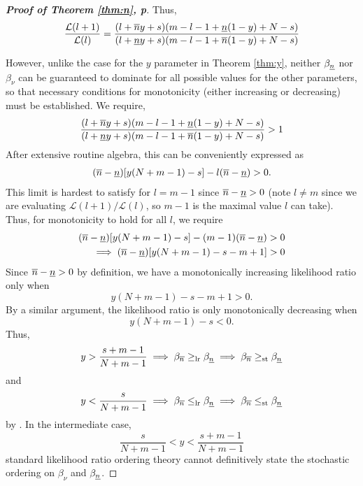 \documentclass[12pt, a4paper]{elsarticle}
\begin{document}
\begin{proof}[\textbf{Proof of Theorem \ref{thm:n}, p\pageref{thm:n}}]
  Thus,
  \[ \frac{\mathcal{L}(l+1)}{\mathcal{L}(l)} =
      \frac{(l + \overline{n} y + s) (m - l - 1 + \underline{n} (1 - y) + N - s)}
           {(l + \underline{n} y + s) (m - l - 1 + \overline{n} (1 - y) + N - s)}
  \]
  
  However, unlike the case for the $y$ parameter in Theorem \ref{thm:y}, neither $\beta_{\underline{n}}$ 
  nor $\beta_{\nu}$ can be guaranteed to dominate for all possible values 
  for the other parameters, so that necessary conditions for
  monotonicity (either increasing or decreasing) must be established.
  We require,
  \[ \frac{(l + \overline{n} y + s) (m - l - 1 + \underline{n} (1 - y) + N - s)}
          {(l + \underline{n} y + s) (m - l - 1 + \overline{n} (1 - y) + N - s)}
     >1
  \]
  After extensive routine algebra, this can be conveniently expressed as
  \begin{align*}
    (\overline{n} - \underline{n})[y (N + m - 1) - s] - l (\overline{n} - \underline{n})>0.
  \end{align*}
  This limit is hardest to satisfy for $l=m-1$ since $\overline{n}-\underline{n}>0$ (note $l\ne m$ since we are evaluating $\mathcal{L}(l+1)/\mathcal{L}(l)$, so $m-1$ is the maximal value $l$ can take).
  Thus, for monotonicity to hold for all $l$, we require
  \begin{align*}
    (\overline{n} - \underline{n})[y (N + m - 1) - s] - (m - 1) (\overline{n} - \underline{n}) &>0 \\
    \implies (\overline{n} - \underline{n})[y (N + m - 1) - s - m + 1] &>0
  \end{align*}
  Since $\overline{n}-\underline{n}>0$ by definition, we have a monotonically increasing 
  likelihood ratio only when \[ y (N + m - 1) - s - m + 1 > 0. \]
  By a similar argument, the likelihood ratio is only monotonically decreasing when
  \[ y (N + m - 1) - s < 0. \]
  Thus,
  \begin{equation}
    y > \frac{s + m - 1}{N + m - 1} \implies \beta_{\overline{n}} \ge_{\mathrm{lr}} \beta_{\underline{n}} \implies \beta_{\overline{n}} \ge_{\mathrm{st}} \beta_{\underline{n}}
    \label{eq:nuDOMnl}
  \end{equation}
  and 
  \begin{equation}
    y < \frac{s}{N + m - 1} \implies \beta_{\overline{n}} \le_{\mathrm{lr}} \beta_{\underline{n}} \implies \beta_{\overline{n}} \le_{\mathrm{st}} \beta_{\underline{n}} 
    \label{eq:nlDOMnu}
  \end{equation}
  by \cite[Theorem 1.C.1, p.43]{shaked2007}.  In the intermediate case,
  \[ \frac{s}{N+m-1} < y < \frac{s+m-1}{N+m-1} \]
  standard likelihood ratio ordering theory cannot definitively state
  the stochastic ordering on $\beta_{\nu}$ and $\beta_{\underline{n}}$.
\end{proof}
\end{document}
